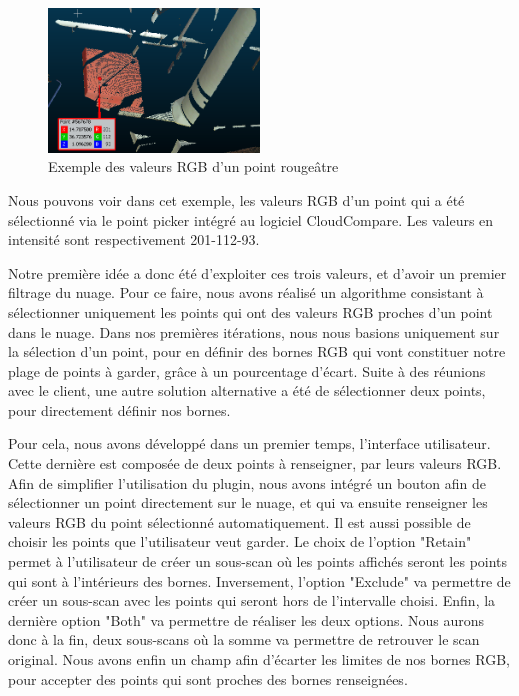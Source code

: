 \documentclass[12pt,titlepage,french]{article}
\begin{document}
\begin{figure}[H]
\center
\includegraphics[width=0.5\textwidth]{./img/exemple_rgb.PNG}
    \caption{\label{} Exemple des valeurs RGB d'un point rougeâtre}
\end{figure}

Nous pouvons voir dans cet exemple, les valeurs RGB d'un point qui a été sélectionné via le point picker intégré au logiciel CloudCompare. Les valeurs en intensité sont respectivement 201-112-93. \newline

Notre première idée a donc été d'exploiter ces trois valeurs, et d'avoir un premier filtrage du nuage. Pour ce faire, nous avons réalisé un algorithme consistant à sélectionner uniquement les points qui ont des valeurs RGB proches d'un point dans le nuage. Dans nos premières itérations, nous nous basions uniquement sur la sélection d'un point, pour en définir des bornes RGB qui vont constituer notre plage de points à garder, grâce à un pourcentage d'écart. Suite à des réunions avec le client, une autre solution alternative a été de sélectionner deux points, pour directement définir nos bornes. \newline

Pour cela, nous avons développé dans un premier temps, l'interface utilisateur. Cette dernière est composée de deux points à renseigner, par leurs valeurs RGB. Afin de simplifier l'utilisation du plugin, nous avons intégré un bouton afin de sélectionner un point directement sur le nuage, et qui va ensuite renseigner les valeurs RGB du point sélectionné automatiquement. Il est aussi possible de choisir les points que l'utilisateur veut garder. Le choix de l'option "Retain" permet à l'utilisateur de créer un sous-scan où les points affichés seront les points qui sont à l'intérieurs des bornes. Inversement, l'option "Exclude" va permettre de créer un sous-scan avec les points qui seront hors de l'intervalle choisi. Enfin, la dernière option "Both" va permettre de réaliser les deux options. Nous aurons donc à la fin, deux sous-scans où la somme va permettre de retrouver le scan original. Nous avons enfin un champ afin d'écarter les limites de nos bornes RGB, pour accepter des points qui sont proches des bornes renseignées.
\end{document}
